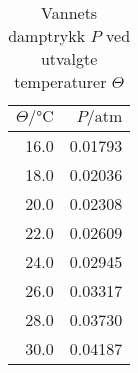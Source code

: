 	
	
	\begin{table}[htpb]
		\centering
		\caption{Vannets damptrykk $P$ ved utvalgte temperaturer $\Theta$}
		\label{vap}
		\begin{tabular}{rr}
			\toprule
			$\Theta/\si{\degreeCelsius}$ & $P/\text{atm}$ \\
			\midrule
			16.0 & 0.01793 \\
			18.0 & 0.02036 \\
			20.0 & 0.02308 \\
			22.0 & 0.02609 \\
			24.0 & 0.02945 \\
			26.0 & 0.03317 \\
			28.0 & 0.03730 \\
			30.0 & 0.04187 \\ \bottomrule
		\end{tabular}
	\end{table}
	
